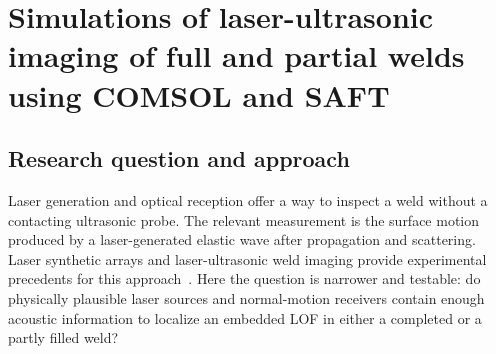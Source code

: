 \begingroup
{}
\titlespacing*{\chapter}{0pt}{0pt}{12pt}
\titlespacing*{\section}{0pt}{14pt}{6pt}
\titlespacing*{\subsection}{0pt}{10pt}{4pt}
\setlength{\parskip}{5pt}
\setlength{\parindent}{0pt}
\setlength{\emergencystretch}{2em}
\raggedbottom
{}
\providecommand{\CombinedFullAppendix}{\ifcsname r@explain:app_full\endcsname Appendix~\ref{explain:app_full}\else the full-weld explanatory appendix\fi}
\providecommand{\CombinedPartialAppendix}{\ifcsname r@explain:app_partial\endcsname Appendix~\ref{explain:app_partial}\else the partial-weld explanatory appendix\fi}

\chapter{Simulations of laser-ultrasonic imaging of full and partial welds using COMSOL and SAFT}
\label{combinedex:chapter}

\section{Research question and approach}
\label{combinedex:intro}
Laser generation and optical reception offer a way to inspect a weld without a contacting ultrasonic probe. The relevant measurement is the surface motion produced by a laser-generated elastic wave after propagation and scattering. Laser synthetic arrays and laser-ultrasonic weld imaging provide experimental precedents for this approach~\cite{stratoudaki,levesque}. Here the question is narrower and testable: do physically plausible laser sources and normal-motion receivers contain enough acoustic information to localize an embedded LOF in either a completed or a partly filled weld?

